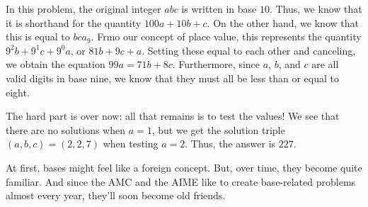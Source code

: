 \documentclass{article}
\begin{document}
In this problem, the original integer $abc$ is written in base $10$. Thus, we know that it is shorthand for the quantity $100a+10b+c$. On the other hand, we know that this is equal to $bca_9$. Frmo our concept of place value, this represents the quantity $9^2b+9^{1}c+9^{0}a$, or $81b+9c+a$. Setting these equal to each other and canceling, we obtain the equation $99a=71b+8c$. Furthermore, since $a$, $b$, and $c$ are all valid digits in base nine, we know that they must all be less than or equal to eight.

The hard part is over now: all that remains is to test the values! We see that there are no solutions when $a=1$, but we get the solution triple $(a,b,c)=(2,2,7)$ when testing $a=2$. Thus, the answer is $\boxed{227}$. 

At first, bases might feel like a foreign concept. But, over time, they become quite familiar. And since the AMC and the AIME like to create base-related problems almost every year, they'll soon become old friends.
\end{document}
